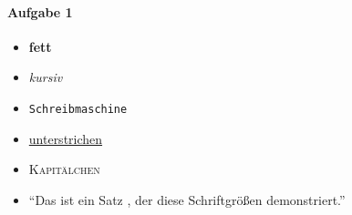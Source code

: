 \documentclass[ngerman, a4paper, 12pt]{scrartcl}
\begin{document}
\paragraph{Aufgabe 1}
\begin{itemize}
    \item \textbf{fett}
    \item \textit{kursiv}
    \item \texttt{Schreibmaschine}
    \item \underline{unterstrichen}
    \item \textsc{Kapitälchen}
\end{itemize}
\begin{itemize}
    \item ``\tiny{Das ist} \small{ein Satz} \normalsize{, der diese}
        \huge{Schriftgrößen demonstriert.''}
\end{itemize}
\end{document}
